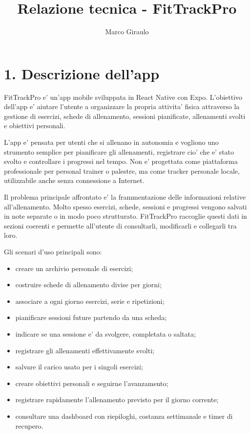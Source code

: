 \documentclass[11pt,a4paper]{article}
\title{Relazione tecnica - FitTrackPro}
\author{Marco Giraulo}
\date{}
\begin{document}
\maketitle
\tableofcontents
\newpage

\section{1. Descrizione dell'app}

FitTrackPro e' un'app mobile sviluppata in React Native con Expo. L'obiettivo dell'app e' aiutare l'utente a organizzare la propria attivita' fisica attraverso la gestione di esercizi, schede di allenamento, sessioni pianificate, allenamenti svolti e obiettivi personali.

L'app e' pensata per utenti che si allenano in autonomia e vogliono uno strumento semplice per pianificare gli allenamenti, registrare cio' che e' stato svolto e controllare i progressi nel tempo. Non e' progettata come piattaforma professionale per personal trainer o palestre, ma come tracker personale locale, utilizzabile anche senza connessione a Internet.

Il problema principale affrontato e' la frammentazione delle informazioni relative all'allenamento. Molto spesso esercizi, schede, sessioni e progressi vengono salvati in note separate o in modo poco strutturato. FitTrackPro raccoglie questi dati in sezioni coerenti e permette all'utente di consultarli, modificarli e collegarli tra loro.

Gli scenari d'uso principali sono:

\begin{itemize}
  \item creare un archivio personale di esercizi;
  \item costruire schede di allenamento divise per giorni;
  \item associare a ogni giorno esercizi, serie e ripetizioni;
  \item pianificare sessioni future partendo da una scheda;
  \item indicare se una sessione e' da svolgere, completata o saltata;
  \item registrare gli allenamenti effettivamente svolti;
  \item salvare il carico usato per i singoli esercizi;
  \item creare obiettivi personali e seguirne l'avanzamento;
  \item registrare rapidamente l'allenamento previsto per il giorno corrente;
  \item consultare una dashboard con riepiloghi, costanza settimanale e timer di recupero.
\end{itemize}
\end{document}
